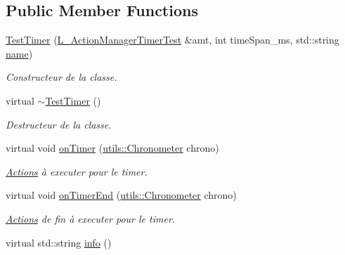 \subsection*{Public Member Functions}
\begin{DoxyCompactItemize}
\item 
\hyperlink{classTestTimer_a8a2c175537abc63088c9e7dfc3b46979}{Test\+Timer} (\hyperlink{classL__ActionManagerTimerTest}{L\+\_\+\+Action\+Manager\+Timer\+Test} \&amt, int time\+Span\+\_\+ms, std\+::string \hyperlink{classITimerPosixListener_a56abc90e01e315320b855399b2c0096e}{name})
\begin{DoxyCompactList}\small\item\em Constructeur de la classe. \end{DoxyCompactList}\item 
\mbox{\label{classTestTimer_a9f6f53116d251719b18e36f2341fd657}} 
virtual \hyperlink{classTestTimer_a9f6f53116d251719b18e36f2341fd657}{$\sim$\+Test\+Timer} ()
\begin{DoxyCompactList}\small\item\em Destructeur de la classe. \end{DoxyCompactList}\item 
\mbox{\label{classTestTimer_a532e1125be7feedfba995aa8cf48cff1}} 
virtual void \hyperlink{classTestTimer_a532e1125be7feedfba995aa8cf48cff1}{on\+Timer} (\hyperlink{classutils_1_1Chronometer}{utils\+::\+Chronometer} chrono)
\begin{DoxyCompactList}\small\item\em \hyperlink{classActions}{Actions} à executer pour le timer. \end{DoxyCompactList}\item 
\mbox{\label{classTestTimer_ade578a88b83d5cf626b1882195ac3fcb}} 
virtual void \hyperlink{classTestTimer_ade578a88b83d5cf626b1882195ac3fcb}{on\+Timer\+End} (\hyperlink{classutils_1_1Chronometer}{utils\+::\+Chronometer} chrono)
\begin{DoxyCompactList}\small\item\em \hyperlink{classActions}{Actions} de fin à executer pour le timer. \end{DoxyCompactList}\item 
\mbox{\label{classTestTimer_a304cc842e688910a2e05b38e69d6e329}} 
virtual std\+::string \hyperlink{classTestTimer_a304cc842e688910a2e05b38e69d6e329}{info} ()

\end{DoxyCompactItemize}
